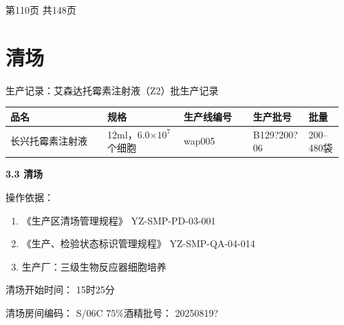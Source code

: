 \documentclass[UTF8,10pt,a4paper,fontset=fandol]{ctexart}
\newcommand{\fieldvalue}[1]{#1}
\newcommand{\handwritten}[1]{#1}
\begin{document}
\vfill

\begin{center}
第110页 共148页
\end{center}

\newpage

\section{清场}

\noindent
生产记录：艾森达托霉素注射液（Z2）批生产记录

\begin{tabular}{|p{0.28\linewidth}|p{0.22\linewidth}|p{0.20\linewidth}|p{0.16\linewidth}|p{0.10\linewidth}|}
\hline
品名 & 规格 & 生产线编号 & 生产批号 & 批量 \\
\hline
长兴托霉素注射液 & 12ml，6.0$\times 10^7$个细胞 & 
\fieldvalue{\handwritten{wap005}} &
\fieldvalue{\handwritten{B129?200?06}} &
200--480袋 \\
\hline
\end{tabular}

\medskip

\noindent
\textbf{3.3 清场}

\medskip

\noindent
操作依据：

\begin{enumerate}
  \item 《生产区清场管理规程》 \hfill YZ-SMP-PD-03-001
  \item 《生产、检验状态标识管理规程》 \hfill YZ-SMP-QA-04-014
  \item 生产厂：三级生物反应器细胞培养
\end{enumerate}

\noindent
清场开始时间：
\fieldvalue{\handwritten{15时25分}}

\medskip

\noindent
清场房间编码：
\fieldvalue{\handwritten{S/06C}}
\hfill
75\%酒精批号：
\fieldvalue{\handwritten{20250819?}}
\end{document}
